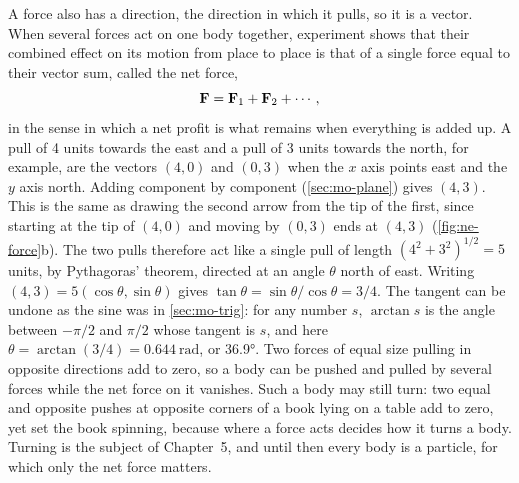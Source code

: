 A force also has a direction, the direction in which it pulls, so it is a
vector. When several forces act on one body together, experiment shows
that their combined effect on its motion from place to place is that of a
single force equal to their vector sum, called the net force,
\begin{equation*}
   \bm{\mathrm{F}} = \bm{\mathrm{F}}_1 + \bm{\mathrm{F}}_2 + \dotsb ,
\end{equation*}
in the sense in which a net profit is what remains when everything is
added up. A pull of 4 units towards the east and a pull of 3 units towards
the north, for example, are the vectors $(4, 0)$ and $(0, 3)$ when the
$x$ axis points east and the $y$ axis north. Adding component by
component (\cref{sec:mo-plane}) gives $(4, 3)$. This is the same as
drawing the second arrow from the tip of the first, since starting at the
tip of $(4, 0)$ and moving by $(0, 3)$ ends at $(4, 3)$
(\cref{fig:ne-force}b). The two pulls therefore act like a single pull of
length $(4^2 + 3^2)^{1/2} = 5$ units, by Pythagoras' theorem, directed at
an angle $\theta$ north of east. Writing $(4, 3) = 5(\cos\theta,
\sin\theta)$ gives $\tan\theta = \sin\theta/\cos\theta = 3/4$. The tangent can be
undone as the sine was in \cref{sec:mo-trig}: for any number $s$,
$\arctan s$ is the angle between $-\pi/2$ and $\pi/2$ whose tangent is
$s$, and here $\theta = \arctan(3/4) = \SI{0.644}{\radian}$, or
\ang{36.9}. Two forces of equal size pulling
in opposite directions add to zero, so a body can be pushed and pulled by
several forces while the net force on it vanishes. Such a body may
still turn: two equal and opposite pushes at opposite corners of a book
lying on a table add to zero, yet set the book spinning, because where a
force acts decides how it turns a body. Turning is the subject of
Chapter~5, and until then every body is a particle, for which only the
net force matters.


